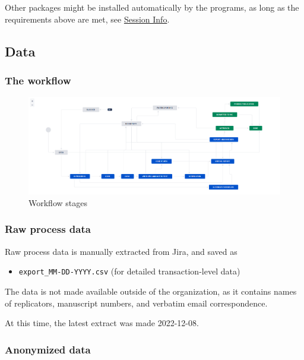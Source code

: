 \documentclass[
]{article}
\providecommand{\tightlist}{%
  \setlength{\itemsep}{0pt}\setlength{\parskip}{0pt}}
\begin{document}
Other packages might be installed automatically by the programs, as long
as the requirements above are met, see
\protect\hyperlink{r-session-info}{Session Info}.

\hypertarget{data}{%
\subsection{Data}\label{data}}

\hypertarget{the-workflow}{%
\subsubsection{The workflow}\label{the-workflow}}

\begin{figure}
\centering
\includegraphics{images/AEADataEditorWorkflow-20191028.png}
\caption{Workflow stages}
\end{figure}

\hypertarget{raw-process-data}{%
\subsubsection{Raw process data}\label{raw-process-data}}

Raw process data is manually extracted from Jira, and saved as

\begin{itemize}
\tightlist
\item
  \texttt{export\_MM-DD-YYYY.csv} (for detailed transaction-level data)
\end{itemize}

The data is not made available outside of the organization, as it
contains names of replicators, manuscript numbers, and verbatim email
correspondence.

At this time, the latest extract was made 2022-12-08.

\hypertarget{anonymized-data}{%
\subsubsection{Anonymized data}\label{anonymized-data}}
\end{document}
